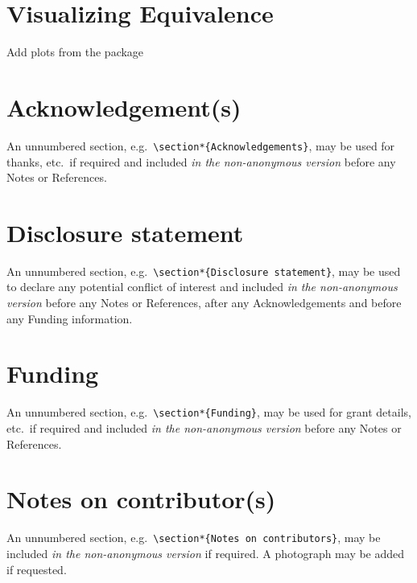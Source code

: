 \documentclass[]{interact}
\theoremstyle{plain}%
\theoremstyle{definition}
\theoremstyle{remark}
\begin{document}
\hypertarget{visualizing-equivalence}{%
\section{Visualizing Equivalence}\label{visualizing-equivalence}}

Add plots from the package

\hypertarget{acknowledgements}{%
\section*{Acknowledgement(s)}\label{acknowledgements}}

An unnumbered section,
e.g.~\texttt{\textbackslash{}section*\{Acknowledgements\}}, may be used
for thanks, etc.~if required and included \emph{in the non-anonymous
version} before any Notes or References.

\hypertarget{disclosure-statement}{%
\section*{Disclosure statement}\label{disclosure-statement}}

An unnumbered section,
e.g.~\texttt{\textbackslash{}section*\{Disclosure\ statement\}}, may be
used to declare any potential conflict of interest and included \emph{in
the non-anonymous version} before any Notes or References, after any
Acknowledgements and before any Funding information.

\hypertarget{funding}{%
\section*{Funding}\label{funding}}

An unnumbered section,
e.g.~\texttt{\textbackslash{}section*\{Funding\}}, may be used for grant
details, etc.~if required and included \emph{in the non-anonymous
version} before any Notes or References.

\hypertarget{notes-on-contributors}{%
\section*{Notes on contributor(s)}\label{notes-on-contributors}}

An unnumbered section,
e.g.~\texttt{\textbackslash{}section*\{Notes\ on\ contributors\}}, may
be included \emph{in the non-anonymous version} if required. A
photograph may be added if requested.
\end{document}

